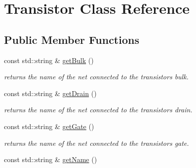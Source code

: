 \hypertarget{class_open_chams_1_1_transistor}{}\section{Transistor Class Reference}
\label{class_open_chams_1_1_transistor}
\subsection*{Public Member Functions}
\begin{DoxyCompactItemize}
\item 
\mbox{\label{class_open_chams_1_1_transistor_a27ba43f825f9243556ec65d306a2b1a7}} 
const std\+::string \& \hyperlink{class_open_chams_1_1_transistor_a27ba43f825f9243556ec65d306a2b1a7}{get\+Bulk} ()
\begin{DoxyCompactList}\small\item\em returns the name of the net connected to the transistor\textquotesingle{}s bulk. \end{DoxyCompactList}\item 
\mbox{\label{class_open_chams_1_1_transistor_a62ea0998b3a61310a8331873f5bcce58}} 
const std\+::string \& \hyperlink{class_open_chams_1_1_transistor_a62ea0998b3a61310a8331873f5bcce58}{get\+Drain} ()
\begin{DoxyCompactList}\small\item\em returns the name of the net connected to the transistor\textquotesingle{}s drain. \end{DoxyCompactList}\item 
\mbox{\label{class_open_chams_1_1_transistor_a99f1449aa735ff6cb4927b4f6aa34d9d}} 
const std\+::string \& \hyperlink{class_open_chams_1_1_transistor_a99f1449aa735ff6cb4927b4f6aa34d9d}{get\+Gate} ()
\begin{DoxyCompactList}\small\item\em returns the name of the net connected to the transistor\textquotesingle{}s gate. \end{DoxyCompactList}\item 
\mbox{\label{class_open_chams_1_1_transistor_a2858c0c4e8b5108f041237cf5a802029}} 
const std\+::string \& \hyperlink{class_open_chams_1_1_transistor_a2858c0c4e8b5108f041237cf5a802029}{get\+Name} ()

\end{DoxyCompactItemize}
